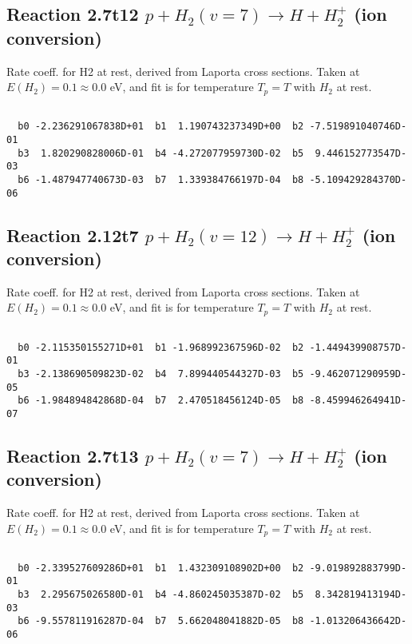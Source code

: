 \documentclass[12pt,dvipdfmx]{article}
\begin{document}
\newpage
\subsection{
Reaction 2.7t12
$ p + H_2(v=7) \rightarrow H + H_2^+$ (ion conversion)
}
Rate coeff. for H2 at rest, derived from Laporta cross sections.
Taken at $E(H_2) = 0.1 \approx 0.0$ eV,  and fit is for temperature $T_p=T$ with $H_2$ at rest.

\begin{small}\begin{verbatim}

  b0 -2.236291067838D+01  b1  1.190743237349D+00  b2 -7.519891040746D-01
  b3  1.820290828006D-01  b4 -4.272077959730D-02  b5  9.446152773547D-03
  b6 -1.487947740673D-03  b7  1.339384766197D-04  b8 -5.109429284370D-06

\end{verbatim}\end{small}

\newpage
\subsection{
Reaction 2.12t7
$ p + H_2(v=12) \rightarrow H + H_2^+$ (ion conversion)
}
Rate coeff. for H2 at rest, derived from Laporta cross sections.
Taken at $E(H_2) = 0.1 \approx 0.0$ eV,  and fit is for temperature $T_p=T$ with $H_2$ at rest.

\begin{small}\begin{verbatim}

  b0 -2.115350155271D+01  b1 -1.968992367596D-02  b2 -1.449439908757D-01
  b3 -2.138690509823D-02  b4  7.899440544327D-03  b5 -9.462071290959D-05
  b6 -1.984894842868D-04  b7  2.470518456124D-05  b8 -8.459946264941D-07

\end{verbatim}\end{small}

\newpage
\subsection{
Reaction 2.7t13
$ p + H_2(v=7) \rightarrow H + H_2^+$ (ion conversion)
}
Rate coeff. for H2 at rest, derived from Laporta cross sections.
Taken at $E(H_2) = 0.1 \approx 0.0$ eV,  and fit is for temperature $T_p=T$ with $H_2$ at rest.

\begin{small}\begin{verbatim}

  b0 -2.339527609286D+01  b1  1.432309108902D+00  b2 -9.019892883799D-01
  b3  2.295675026580D-01  b4 -4.860245035387D-02  b5  8.342819413194D-03
  b6 -9.557811916287D-04  b7  5.662048041882D-05  b8 -1.013206436642D-06

\end{verbatim}\end{small}
\end{document}
